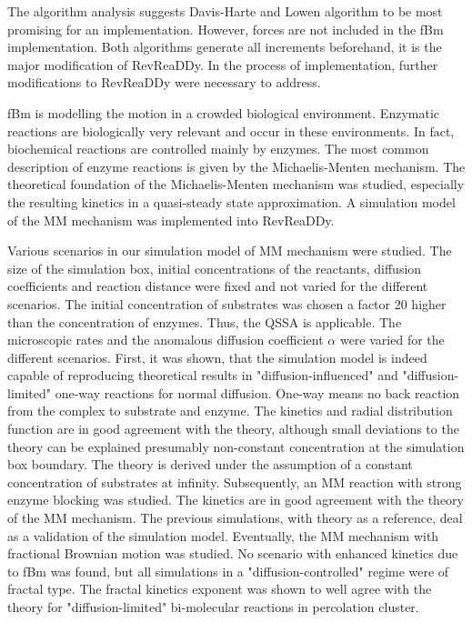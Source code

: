 \documentclass[
  a4paper,BCOR10mm,twoside,
  headsepline,footsepline,%
  fleqn,openbib
]{scrbook}
\begin{document}
The algorithm analysis suggests Davis-Harte and Lowen algorithm to be most promising for an implementation. However, forces are not included in the fBm implementation. Both algorithms generate all increments beforehand, it is the major modification of RevReaDDy. In the process of implementation, further modifications to RevReaDDy were necessary to address. \par
fBm is modelling the motion in a crowded biological environment. Enzymatic reactions are biologically very relevant and occur in these environments. In fact, biochemical reactions are controlled mainly by enzymes. The most common description of enzyme reactions is given by the Michaelis-Menten mechanism. The theoretical foundation of the Michaelis-Menten mechanism was studied, especially the resulting kinetics in a quasi-steady state approximation. A simulation model of the MM mechanism was implemented into RevReaDDy. 
\par
Various scenarios in our simulation model of MM mechanism were studied. The size of the simulation box, initial concentrations of the reactants, diffusion coefficients and reaction distance were fixed and not varied for the different scenarios. The initial concentration of substrates was chosen a factor 20 higher than the concentration of enzymes. Thus, the QSSA is applicable. The microscopic rates and the anomalous diffusion coefficient $\alpha$ were varied for the different scenarios. First, it was shown, that the simulation model is indeed capable of reproducing theoretical results in "diffusion-influenced" and "diffusion-limited" one-way reactions for normal diffusion. One-way means no back reaction from the complex to substrate and enzyme. The kinetics and radial distribution function are in good agreement with the theory, although small deviations to the theory can be explained presumably non-constant concentration at the simulation box boundary. The theory is derived under the assumption of a constant concentration of substrates at infinity. Subsequently, an MM reaction with strong enzyme blocking was studied. The kinetics are in good agreement with the theory of the MM mechanism. The previous simulations, with theory as  a reference, deal as a validation of the simulation model. Eventually, the MM mechanism with fractional Brownian motion was studied. No scenario with enhanced kinetics due to fBm was found, but all simulations in a "diffusion-controlled" regime were of fractal type.  
The fractal kinetics exponent was shown to well agree with the theory for "diffusion-limited" bi-molecular reactions in percolation cluster. 
\end{document}

